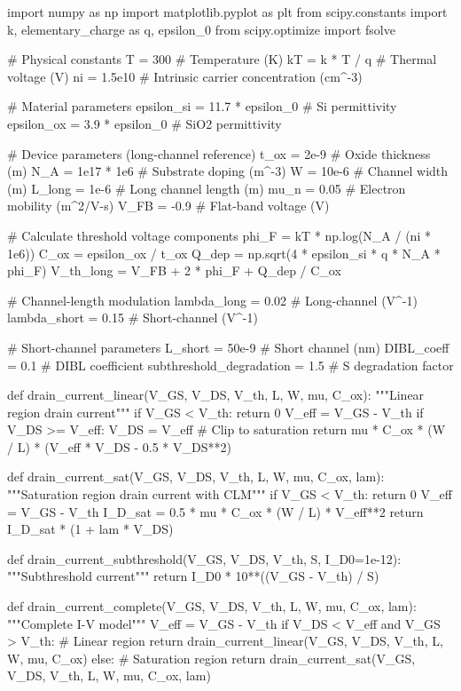 \documentclass[a4paper, 11pt]{article}
\begin{document}
\begin{pycode}
import numpy as np
import matplotlib.pyplot as plt
from scipy.constants import k, elementary_charge as q, epsilon_0
from scipy.optimize import fsolve

# Physical constants
T = 300  # Temperature (K)
kT = k * T / q  # Thermal voltage (V)
ni = 1.5e10  # Intrinsic carrier concentration (cm^-3)

# Material parameters
epsilon_si = 11.7 * epsilon_0  # Si permittivity
epsilon_ox = 3.9 * epsilon_0   # SiO2 permittivity

# Device parameters (long-channel reference)
t_ox = 2e-9  # Oxide thickness (m)
N_A = 1e17 * 1e6  # Substrate doping (m^-3)
W = 10e-6  # Channel width (m)
L_long = 1e-6  # Long channel length (m)
mu_n = 0.05  # Electron mobility (m^2/V-s)
V_FB = -0.9  # Flat-band voltage (V)

# Calculate threshold voltage components
phi_F = kT * np.log(N_A / (ni * 1e6))
C_ox = epsilon_ox / t_ox
Q_dep = np.sqrt(4 * epsilon_si * q * N_A * phi_F)
V_th_long = V_FB + 2 * phi_F + Q_dep / C_ox

# Channel-length modulation
lambda_long = 0.02  # Long-channel (V^-1)
lambda_short = 0.15  # Short-channel (V^-1)

# Short-channel parameters
L_short = 50e-9  # Short channel (nm)
DIBL_coeff = 0.1  # DIBL coefficient
subthreshold_degradation = 1.5  # S degradation factor

def drain_current_linear(V_GS, V_DS, V_th, L, W, mu, C_ox):
    """Linear region drain current"""
    if V_GS < V_th:
        return 0
    V_eff = V_GS - V_th
    if V_DS >= V_eff:
        V_DS = V_eff  # Clip to saturation
    return mu * C_ox * (W / L) * (V_eff * V_DS - 0.5 * V_DS**2)

def drain_current_sat(V_GS, V_DS, V_th, L, W, mu, C_ox, lam):
    """Saturation region drain current with CLM"""
    if V_GS < V_th:
        return 0
    V_eff = V_GS - V_th
    I_D_sat = 0.5 * mu * C_ox * (W / L) * V_eff**2
    return I_D_sat * (1 + lam * V_DS)

def drain_current_subthreshold(V_GS, V_DS, V_th, S, I_D0=1e-12):
    """Subthreshold current"""
    return I_D0 * 10**((V_GS - V_th) / S)

def drain_current_complete(V_GS, V_DS, V_th, L, W, mu, C_ox, lam):
    """Complete I-V model"""
    V_eff = V_GS - V_th
    if V_DS < V_eff and V_GS > V_th:
        # Linear region
        return drain_current_linear(V_GS, V_DS, V_th, L, W, mu, C_ox)
    else:
        # Saturation region
        return drain_current_sat(V_GS, V_DS, V_th, L, W, mu, C_ox, lam)


\end{pycode}
\end{document}
